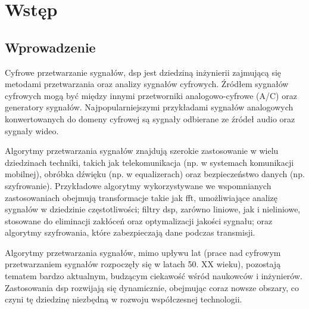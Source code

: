 \chapter*{Wstęp}
\label{cha:wstęp}

\section*{Wprowadzenie}
\label{sec:wprowadzenie}

Cyfrowe przetwarzanie sygnałów, \ac{dsp} jest dziedziną inżynierii zajmującą się metodami przetwarzania oraz analizy sygnałów cyfrowych. Źródłem sygnałów cyfrowych mogą być między innymi przetworniki analogowo-cyfrowe (A/C) oraz generatory sygnałów. Najpopularniejszymi przykładami sygnałów analogowych konwertowanych do domeny cyfrowej są sygnały odbierane ze źródeł audio oraz sygnały wideo.

Algorytmy przetwarzania sygnałów znajdują szerokie zastosowanie w wielu dziedzinach techniki, takich jak telekomunikacja (np. w systemach komunikacji mobilnej), obróbka dźwięku (np. w equalizerach) oraz bezpieczeństwo danych (np. szyfrowanie). Przykładowe algorytmy wykorzystywane we wspomnianych zastosowaniach obejmują transformacje takie jak \ac{fft}, umożliwiające analizę sygnałów w dziedzinie częstotliwości; filtry \ac{dsp}, zarówno liniowe, jak i nieliniowe, stosowane do eliminacji zakłóceń oraz optymalizacji jakości sygnału; oraz algorytmy szyfrowania, które zabezpieczają dane podczas transmisji.

Algorytmy przetwarzania sygnałów, mimo upływu lat (prace nad cyfrowym przetwarzaniem sygnałów rozpoczęły się w latach 50. XX wieku), pozostają tematem bardzo aktualnym, budzącym ciekawość wśród naukowców i inżynierów. Zastosowania \ac{dsp} rozwijają się dynamicznie, obejmując coraz nowsze obszary, co czyni tę dziedzinę niezbędną w rozwoju współczesnej technologii.


